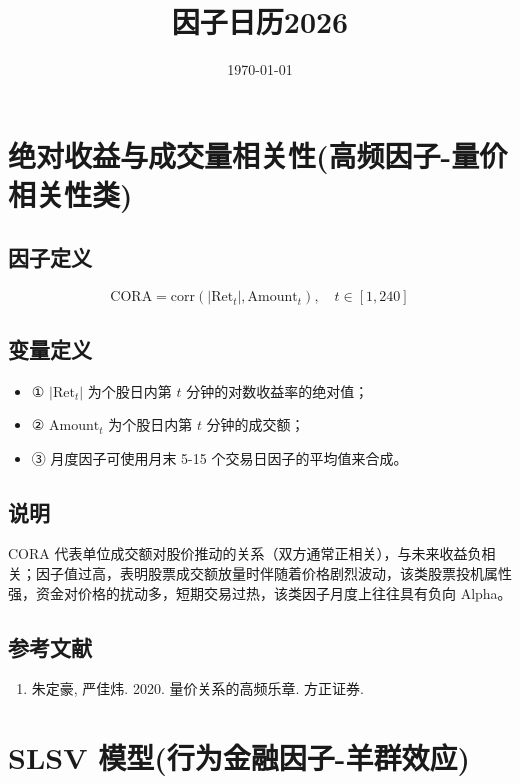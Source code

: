 \documentclass{article}
\title{因子日历2026}
\date{\today}
\begin{document}
\maketitle

\section{绝对收益与成交量相关性(高频因子-量价相关性类)}

\subsection{因子定义}
\begin{equation}
    \mathrm{CORA} = \mathrm{corr}(| \mathrm{Ret}_t |, \mathrm{Amount}_t), \quad t \in [1, 240]
\end{equation}

\subsection{变量定义}
\begin{itemize}
    \item ① \( | \mathrm{Ret}_t | \) 为个股日内第 \( t \) 分钟的对数收益率的绝对值；
    \item ② \( \mathrm{Amount}_t \) 为个股日内第 \( t \) 分钟的成交额；
    \item ③ 月度因子可使用月末 5-15 个交易日因子的平均值来合成。
\end{itemize}

\subsection{说明}
CORA 代表单位成交额对股价推动的关系（双方通常正相关），与未来收益负相关；因子值过高，表明股票成交额放量时伴随着价格剧烈波动，该类股票投机属性强，资金对价格的扰动多，短期交易过热，该类因子月度上往往具有负向 Alpha。

\subsection{参考文献}
\begin{enumerate}
    \item 朱定豪, 严佳炜. 2020. 量价关系的高频乐章. 方正证券.
\end{enumerate}

\section{SLSV 模型(行为金融因子-羊群效应)}
\end{document}
